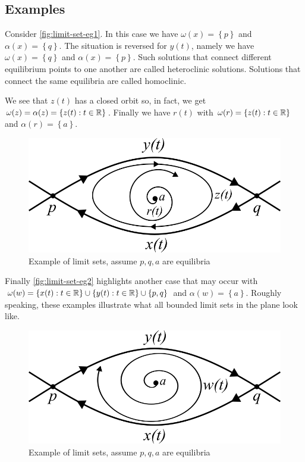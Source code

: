 \subsection{Examples}
Consider \autoref{fig:limit-set-eg1}. In this case we have $\omega(x) = \left\{p\right\}$ and $\alpha(x) = \left\{q\right\}$. The situation is reversed for $y(t)$, namely we have $\omega(x) = \left\{q\right\}$ and $\alpha(x) = \left\{p\right\}$. Such solutions that connect different equilibrium points to one another are called heteroclinic solutions. Solutions that connect the same equilibria are called homoclinic.

We see that $z(t)$ has a closed orbit so, in fact, we get $\omega(z) = \alpha(z) = \left\{ z(t): t \in \mathbb{R} \right\}$. Finally we have $r(t)$ with $\omega(r) = \left\{z(t): t \in \mathbb{R} \right\}$ and $\alpha(r) = \left\{a\right\}$.
\begin{figure}[ht]
    \centering
    \includegraphics[scale=0.5]{Images/limit_set_eg1.png}
    \caption{Example of limit sets, assume $p, q, a$ are equilibria}
    \label{fig:limit-set-eg1}
\end{figure}
Finally \autoref{fig:limit-set-eg2} highlights another case that may occur with $\omega(w) = \left\{x(t): t \in \mathbb{R} \right\} \cup \left\{y(t): t \in \mathbb{R} \right\} \cup \{p, q\}$ and $\alpha(w) = \left\{a\right\}$. Roughly speaking, these examples illustrate what all bounded limit sets in the plane look like.

\begin{figure}[ht]
    \centering
    \includegraphics[scale=0.5]{Images/limit_set_eg2.png}
    \caption{Example of limit sets, assume $p, q, a$ are equilibria}
    \label{fig:limit-set-eg2}
\end{figure}


